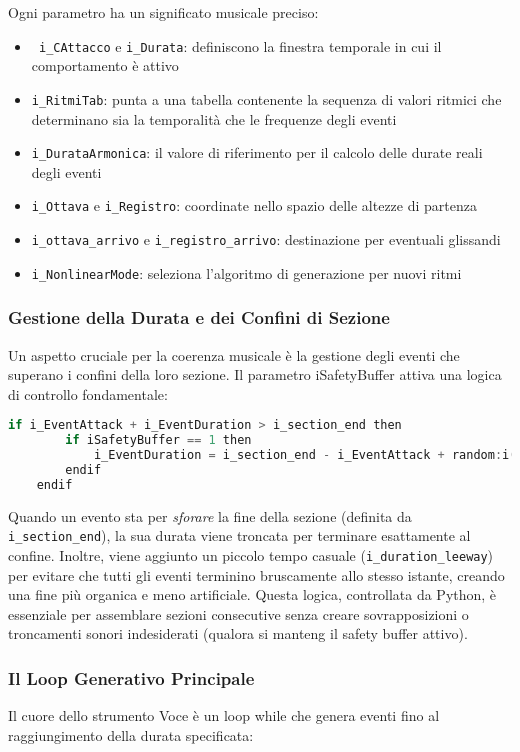 Ogni parametro ha un significato musicale preciso:

\begin{itemize}
 \item \texttt{ i\_CAttacco}  e \texttt{i\_Durata}: definiscono la finestra temporale in cui il comportamento è attivo
 \item \texttt{i\_RitmiTab}: punta a una tabella contenente la sequenza di valori ritmici che determinano sia la temporalità che le frequenze degli eventi
 \item \texttt{i\_DurataArmonica}: il valore di riferimento per il calcolo delle durate reali degli eventi
 \item \texttt{i\_Ottava} e \texttt{i\_Registro}: coordinate nello spazio delle altezze di partenza
 \item \texttt{i\_ottava\_arrivo} e \texttt{i\_registro\_arrivo}: destinazione per eventuali glissandi
 \item \texttt{i\_NonlinearMode}: seleziona l'algoritmo di generazione per nuovi ritmi
\end{itemize}
\subsubsection{Gestione della Durata e dei Confini di Sezione}
Un aspetto cruciale per la coerenza musicale è la gestione degli eventi che superano i confini della loro sezione. Il parametro iSafetyBuffer attiva una logica di controllo fondamentale:

\begin{lstlisting}[language=C]
    if i_EventAttack + i_EventDuration > i_section_end then 
        if iSafetyBuffer == 1 then
            i_EventDuration = i_section_end - i_EventAttack + random:i(0, i_duration_leeway)
        endif
    endif
\end{lstlisting}

Quando un evento sta per \textit{sforare} la fine della sezione (definita da \texttt{i\_section\_end}), la sua durata viene troncata per terminare esattamente al confine. Inoltre, viene aggiunto un piccolo tempo casuale (\texttt{i\_duration\_leeway}) per evitare che tutti gli eventi terminino bruscamente allo stesso istante, creando una fine più organica e meno artificiale. Questa logica, controllata da Python, è essenziale per assemblare sezioni consecutive senza creare sovrapposizioni o troncamenti sonori indesiderati (qualora si manteng il safety buffer attivo).
\subsubsection{Il Loop Generativo Principale}
Il cuore dello strumento Voce è un loop while che genera eventi fino al raggiungimento della durata specificata:

